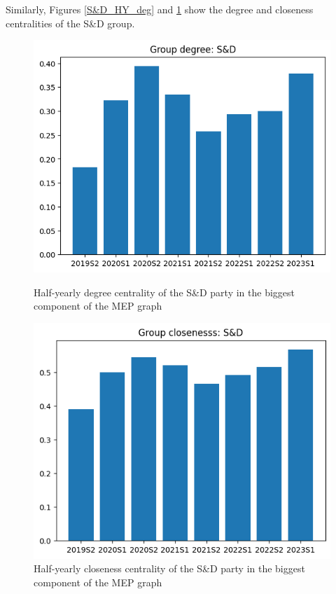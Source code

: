 \documentclass[lettersize,journal]{IEEEtran}
\begin{document}
Similarly, Figures \ref{S&D_HY_deg} and \ref{S&D_HY_cls} show the degree and closeness centralities of the S\&D group.

\begin{figure}[h]
  \centering
  \begin{minipage}[b]{0.23\textwidth}
    \includegraphics[width=\textwidth]{S&D_HY_deg.png}
    \caption{Half-yearly degree centrality of the S\&D party in the biggest component of the MEP graph}
    \label{S&D_HY_deg}
  \end{minipage}
  \hfill
  \begin{minipage}[b]{0.23\textwidth}
    \includegraphics[width=\textwidth]{S&D_HY_cls.png}
    \caption{Half-yearly closeness centrality of the S\&D party in the  biggest component of the MEP graph}
    \label{S&D_HY_cls}
  \end{minipage}
\end{figure}
\end{document}
